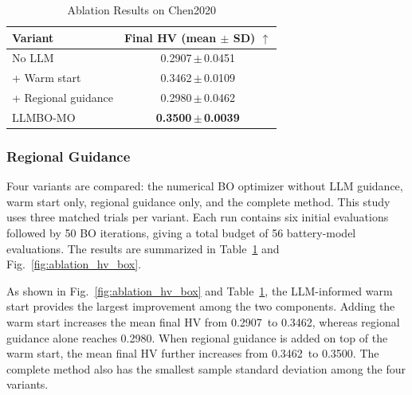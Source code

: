 \documentclass[journal]{IEEEtran}
\newcommand{\AblationBaselineMean}{0.2907}
\newcommand{\AblationBaselineStd}{0.0451}
\newcommand{\AblationWarmMean}{0.3462}
\newcommand{\AblationWarmStd}{0.0109}
\newcommand{\AblationRegionMean}{0.2980}
\newcommand{\AblationRegionStd}{0.0462}
\newcommand{\AblationFullMean}{0.3500}
\newcommand{\AblationFullStd}{0.0039}
\begin{document}
\begin{table}[!t]

\caption{Ablation Results on Chen2020}

\label{tab:ablation}

\centering

\footnotesize

\setlength{\tabcolsep}{4.0pt}

\begin{tabular}{@{}lc@{}}

\toprule

Variant & Final HV (mean $\pm$ SD) $\uparrow$ \\

\midrule

No LLM & \AblationBaselineMean\,$\pm$\,\AblationBaselineStd \\

+ Warm start & \AblationWarmMean\,$\pm$\,\AblationWarmStd \\

+ Regional guidance & \AblationRegionMean\,$\pm$\,\AblationRegionStd \\

LLMBO-MO & \textbf{\AblationFullMean\,$\pm$\,\AblationFullStd} \\

\bottomrule

\end{tabular}

\end{table}

\subsubsection{Regional Guidance}

Four variants are compared: the numerical BO optimizer without LLM guidance,
warm start only, regional guidance only, and the complete method. This
study uses three matched trials per variant. Each run contains six initial
evaluations followed by 50 BO iterations, giving a total budget of 56
battery-model evaluations. The results are summarized in
Table~\ref{tab:ablation} and Fig.~\ref{fig:ablation_hv_box}.

As shown in Fig.~\ref{fig:ablation_hv_box} and Table~\ref{tab:ablation},
the LLM-informed warm start provides the largest improvement among the two
components. Adding the warm start increases the mean final HV from
\AblationBaselineMean\ to \AblationWarmMean, whereas regional guidance alone
reaches \AblationRegionMean. When regional guidance is added on top of the
warm start, the mean final HV further increases from
\AblationWarmMean\ to \AblationFullMean. The complete method also has the
smallest sample standard deviation among the four variants.
\end{document}
